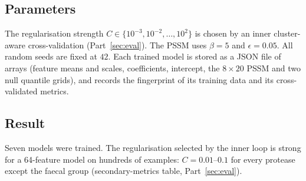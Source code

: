 \subsection{Parameters}

The regularisation strength $C\in\{10^{-3},10^{-2},\dots,10^{2}\}$ is chosen by
an inner cluster-aware cross-validation (Part~\ref{sec:eval}). The PSSM uses
$\beta=5$ and $\epsilon=0.05$. All random seeds are fixed at $42$. Each trained
model is stored as a JSON file of arrays (feature means and scales,
coefficients, intercept, the $8\times20$ PSSM and two null quantile grids),
and records the fingerprint of its training data and its cross-validated
metrics.

\subsection{Result}

Seven models were trained. The regularisation selected by the inner loop is
strong for a 64-feature model on hundreds of examples: $C=0.01$--$0.1$ for every
protease except the faecal group (secondary-metrics table, Part~\ref{sec:eval}).
